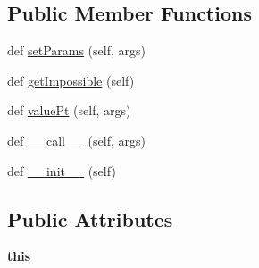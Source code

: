 \subsection*{Public Member Functions}
\begin{DoxyCompactItemize}
\item 
def \hyperlink{classMontePython__cxx_1_1Move_ab9567c700108327b418de46e0463fc29}{set\+Params} (self, args)
\item 
def \hyperlink{classMontePython__cxx_1_1Move_a91508ba5f524fcc4f53facde7cc064e8}{get\+Impossible} (self)
\item 
def \hyperlink{classMontePython__cxx_1_1Move_ae4d99fac2f73b23b7ac98178f377c464}{value\+Pt} (self, args)
\item 
def \hyperlink{classMontePython__cxx_1_1Move_aef43d0102709c4db75143d5537362fa5}{\+\_\+\+\_\+call\+\_\+\+\_\+} (self, args)
\item 
def \hyperlink{classMontePython__cxx_1_1Move_a47b98c0ca1410e628ad34faa4a144dd3}{\+\_\+\+\_\+init\+\_\+\+\_\+} (self)
\end{DoxyCompactItemize}
\subsection*{Public Attributes}
\begin{DoxyCompactItemize}
\item 
\hypertarget{classMontePython__cxx_1_1Move_a575a1ef5f999f632c7d98fe982a5c8a6}{}{\bfseries this}\label{classMontePython__cxx_1_1Move_a575a1ef5f999f632c7d98fe982a5c8a6}

\end{DoxyCompactItemize}
